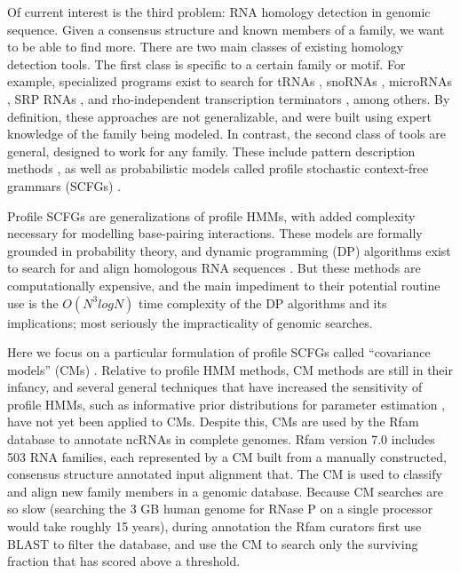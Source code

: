 \documentclass[11pt]{article}
\begin{document}
Of current interest is the third problem: RNA homology detection in
genomic sequence. Given a consensus structure and known members of a family,
we want to be able to find more. 
There are two main classes of existing homology detection tools. 
The first class is specific to a certain family or motif. For example,
specialized programs exist to search for tRNAs \cite{LoweEddy97}, snoRNAs
\cite{LoweEddy99}, microRNAs \cite{Lai03, Lim03}, SRP RNAs
\cite{Regalia02}, and rho-independent transcription terminators
\cite{Ermolaeva00}, among others. By definition, these approaches are not
generalizable, and were built using expert knowledge of the family
being modeled.  In contrast, the second class of tools are general,
designed to work for any family. These include pattern description
methods \cite{Macke01,Gautheret01}, as well as probabilistic models
called profile stochastic context-free grammars (SCFGs) \cite{Eddy94,
 Sakakibara94c}. 

Profile SCFGs are generalizations of profile HMMs, with added
complexity necessary for modelling base-pairing interactions. These
models are formally grounded in probability theory, and dynamic
programming (DP) algorithms exist to search for and align
homologous RNA sequences \cite{Durbin98}. 
But these methods are computationally expensive, and the main
impediment to their potential routine use is the
 $O(N^3 log N)$ time complexity of the DP algorithms and its
implications; most seriously the impracticality of genomic searches.

Here we focus on a particular formulation of profile SCFGs called
``covariance models'' (CMs) \cite{Eddy94, Durbin98, Eddy02b}. 
Relative to profile HMM methods, CM methods are still in their
infancy, and several general techniques that have increased the
sensitivity of profile HMMs, such as informative prior distributions
for parameter estimation \cite{Sjolander96}, have not yet been applied
to CMs. Despite this, CMs are used by the Rfam database
\cite{Griffiths-Jones05} to annotate ncRNAs in complete
genomes. Rfam version 7.0 includes 503 RNA families, each represented
by a CM built from a manually constructed, consensus
structure annotated input alignment that.  The CM is used to
classify and align new family members in a genomic database. Because
CM searches are so slow (searching the 3 GB
human genome for RNase P on a single processor would take roughly 15
years), during annotation the Rfam curators first use \textsc{BLAST}
to filter the database, and use the CM to search only the surviving
fraction that has scored above a threshold. 
\end{document}
